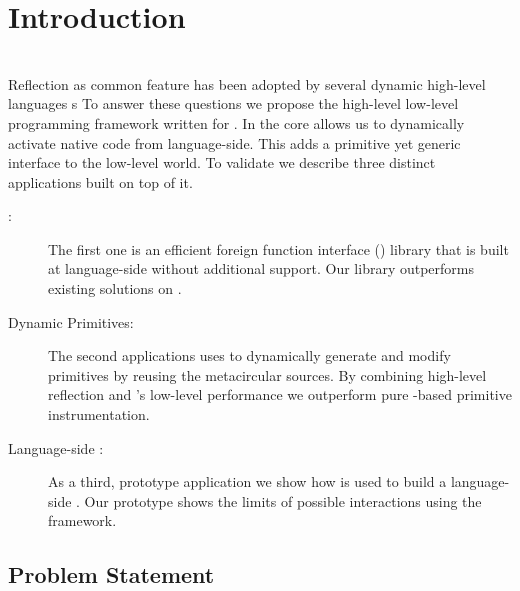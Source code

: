 
\chapter{Introduction}
\minitoc

\\
\noindent Reflection as common feature has been adopted by several dynamic high-level languages s
To answer these questions we propose the high-level low-level programming framework \B written for \PH.
In the core \B allows us to dynamically activate native code from language-side.
This adds a primitive yet generic interface to the low-level \VM world.
To validate \B we describe three distinct applications built on top of it.
%
\begin{description}
	\item[\FFI:] The first one is an efficient foreign function interface (\FFI) library that is built at language-side without additional \VM support.
	Our \FFI library outperforms existing solutions on \PH.
	
	\item[Dynamic Primitives:] The second applications uses \B to dynamically generate and modify \PH primitives by reusing the metacircular \VM sources.
	By combining high-level reflection and \B's low-level performance we outperform pure \PH-based primitive instrumentation.
	
	\item[Language-side \JIT:] As a third, prototype application we show how \B is used to build a language-side \JIT.
	Our prototype shows the limits of possible \VM interactions using the \B framework. 
\end{description}


\section{Problem Statement}


